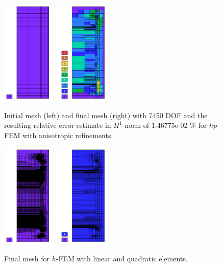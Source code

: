 \begin{figure}[!ht]
\centering
\includegraphics[height=5cm]{nist/nist-5/mesh_hp_aniso_init.png}\ \
\includegraphics[height=5cm]{nist/nist-5/mesh_hp_aniso.png}
\caption{Initial mesh (left) and final mesh (right) with 7450 DOF and the resulting relative error estimate in $H^1$-norm of 1.46775e-02 \% for $hp$-FEM with anisotropic refinements.}
\label{fig:nist-5-hp-aniso}
\end{figure}

\begin{figure}[!ht]
\centering
\includegraphics[height=5cm]{nist/nist-5/mesh_h1_aniso.png}\ \
\includegraphics[height=5cm]{nist/nist-5/mesh_h2_aniso.png}
\caption{Final mesh for $h$-FEM with linear and quadratic elements.}
\label{fig:nist-5-h-aniso}
\end{figure}

